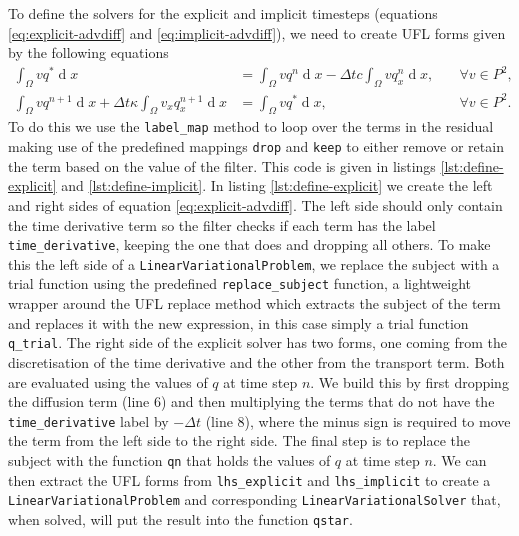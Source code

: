 \documentclass[journal abbreviation, manuscript]{copernicus}
\DeclareMathOperator{\diff}{d}
\begin{document}


To define the solvers for the explicit and implicit timesteps
(equations \ref{eq:explicit-advdiff} and \ref{eq:implicit-advdiff}),
we need to create UFL forms given by the following equations
\begin{align}
  \label{eq:explicit-advdiff}
  \int_\Omega vq^* \diff x &= \int_\Omega vq^n \diff x - \Delta t c \int_\Omega v q_x^n \diff x, &\quad \forall v \in P^2, \\
  \label{eq:implicit-advdiff}
  \int_\Omega vq^{n+1} \diff x  + \Delta t \kappa \int_\Omega v_x q_x^{n+1} \diff x &= \int_\Omega vq^* \diff x, &\quad \forall v \in P^2.
\end{align}
To do this we use the \texttt{label\_map} method to loop over the
terms in the residual making use of the predefined mappings
\texttt{drop} and \texttt{keep} to either remove or retain the term
based on the value of the filter. This code is given in listings
\ref{lst:define-explicit} and \ref{lst:define-implicit}. In listing
\ref{lst:define-explicit} we create the left and right sides of
equation \ref{eq:explicit-advdiff}. The left side should only contain
the time derivative term so the filter checks if each term has the
label \texttt{time\_derivative}, keeping the one that does and
dropping all others. To make this the left side of a
\texttt{LinearVariationalProblem}, we replace the subject with a trial
function using the predefined \texttt{replace\_subject} function, a
lightweight wrapper around the UFL replace method which extracts the
subject of the term and replaces it with the new expression, in this
case simply a trial function \texttt{q\_trial}. The right side of the
explicit solver has two forms, one coming from the discretisation of
the time derivative and the other from the transport term. Both are
evaluated using the values of $q$ at time step $n$. We build this by
first dropping the diffusion term (line 6) and then multiplying the
terms that do not have the \texttt{time\_derivative} label by $-\Delta
t$ (line 8), where the minus sign is required to move the term from
the left side to the right side. The final step is to replace the
subject with the function \texttt{qn} that holds the values of $q$ at
time step $n$. We can then extract the UFL forms from
\texttt{lhs\_explicit} and \texttt{lhs\_implicit} to create a
\texttt{LinearVariationalProblem} and corresponding
\texttt{LinearVariationalSolver} that, when solved, will put the
result into the function \texttt{qstar}.
\end{document}
